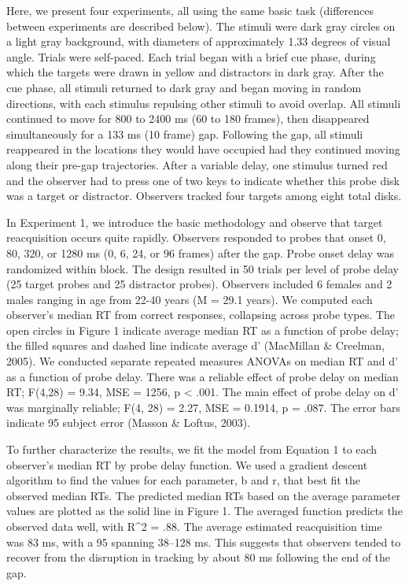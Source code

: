 Here, we present four experiments, all using the same basic task
(differences between experiments are described below).  The stimuli were
dark gray circles on a light gray background, with diameters of
approximately 1.33 degrees of visual angle.  Trials were self-paced.  Each
trial began with a brief cue phase, during which the targets were drawn in
yellow and distractors in dark gray.  After the cue phase, all stimuli
returned to dark gray and began moving in random directions, with each
stimulus repulsing other stimuli to avoid overlap.  All stimuli continued
to move for 800 to 2400 ms (60 to 180 frames), then disappeared
simultaneously for a 133 ms (10 frame) gap.  Following the gap, all stimuli
reappeared in the locations they would have occupied had they continued
moving along their pre-gap trajectories.  After a variable delay, one
stimulus turned red and the observer had to press one of two keys to
indicate whether this probe disk was a target or distractor.  Observers
tracked four targets among eight total disks.

In Experiment 1, we introduce the basic methodology and observe that target
reacquisition occurs quite rapidly.  Observers responded to probes that
onset 0, 80, 320, or 1280 ms (0, 6, 24, or 96 frames) after the gap.  Probe
onset delay was randomized within block.  The design resulted in 50 trials
per level of probe delay (25 target probes and 25 distractor probes).
Observers included 6 females and 2 males ranging in age from 22-40 years (M
= 29.1 years).  We computed each observer's median RT from correct
responses, collapsing across probe types.  The open circles in Figure 1
indicate average median RT as a function of probe delay; the filled squares
and dashed line indicate average d' (MacMillan & Creelman, 2005).  We
conducted separate repeated measures ANOVAs on median RT and d' as a
function of probe delay.  There was a reliable effect of probe delay on
median RT; F(4,28) = 9.34, MSE = 1256, p < .001.  The main effect of probe
delay on d' was marginally reliable; F(4, 28) = 2.27, MSE = 0.1914, p =
.087.  The error bars indicate 95%
subject error (Masson & Loftus, 2003).

To further characterize the results, we fit the model from Equation 1 to
each observer's median RT by probe delay function.  We used a gradient
descent algorithm to find the values for each parameter, b and r, that best
fit the observed median RTs.  The predicted median RTs based on the average
parameter values are plotted as the solid line in Figure 1.  The averaged
function predicts the observed data well, with R^2 = .88.  The average
estimated reacquisition time was 83 ms, with a 95%
spanning 38--128 ms.  This suggests that observers tended to recover from
the disruption in tracking by about 80 ms following the end of the gap.

